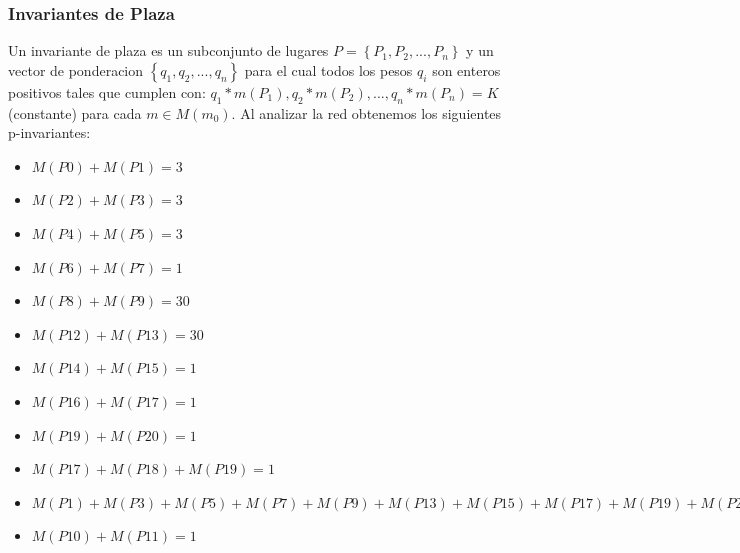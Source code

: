 \documentclass{article}
\begin{document}
		\subsubsection{Invariantes de Plaza}
		Un invariante de plaza es un subconjunto de lugares $P=\left\lbrace P_1,P_2,...,P_n \right\rbrace$ y un vector de ponderacion $\left\lbrace q_1,q_2,..., q_n \right\rbrace$ para el cual todos los pesos $q_i$ son enteros positivos tales que cumplen con:\newline
		$q_1*m(P_1),q_2*m(P_2),..., q_n*m(P_n)=K$ (constante) para cada $m\in M(m_0)$.\newline 
		Al analizar la red obtenemos los siguientes p-invariantes:
		\begin{itemize}
		\item $M(P0)+M(P1)=3$
		\item $M(P2)+M(P3)=3$
		\item $M(P4)+M(P5)=3$
		\item $M(P6)+M(P7)=1$
		\item $M(P8)+M(P9)=30$
		\item $M(P12)+M(P13)=30$
		\item $M(P14)+M(P15)=1$
		\item $M(P16)+M(P17)=1$
		\item $M(P19)+M(P20)=1$
		\item $M(P17)+M(P18)+M(P19)=1$
		\item $M(P1)+M(P3)+M(P5)+M(P7)+M(P9)+M(P13)+M(P15)+M(P17)+M(P19)+M(P21)=100$
		\item $M(P10)+M(P11)=1$
		\end{itemize}		
\end{document}
